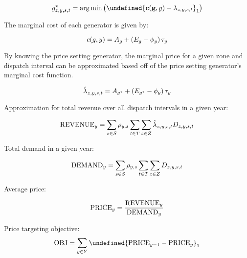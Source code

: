 \documentclass{article}
\let\norm\undefined %
\DeclarePairedDelimiter\norm{\lVert}{\rVert}
\begin{document}
\begin{equation}
\iGenerator^{\star}_{\iZone,\iYear,\iScenario,\iInterval} = \arg\min \left(\norm{\mathbf{c}(\mathbf{\iGenerator}, \iYear) - \dPowerBalance}_{1}\right)
\end{equation}

The marginal cost of each generator is given by:

\begin{equation}
c(\iGenerator, \iYear) = A_{\iGenerator} + \left(\cEmissionsIntensity - \vBaseline\right) \vPermitPrice
\end{equation}

By knowing the price setting generator, the marginal price for a given zone and dispatch interval can be approximated based off of the price setting generator's marginal cost function.

\begin{equation}
\hat{\dPowerBalance[]}_{\iZone,\iYear,\iScenario,\iInterval} = A_{\iGenerator^{\star}} + \left(\cEmissionsIntensity[\iGenerator^{\star}] - \vBaseline\right) \vPermitPrice
\end{equation}

Approximation for total revenue over all dispatch intervals in a given year:

\begin{equation}
\mathrm{REVENUE}_{\iYear} = \sum\limits_{\iScenario \in \sScenarios} \cScenarioDuration \sum\limits_{\iInterval \in \sIntervals}\sum\limits_{\iZone \in \sZones} \hat{\dPowerBalance[]}_{\iZone,\iYear,\iScenario,\iInterval} \cDemand
\end{equation}

Total demand in a given year:

\begin{equation}
\mathrm{DEMAND}_{\iYear} = \sum\limits_{\iScenario \in \sScenarios} \cScenarioDuration \sum\limits_{\iInterval \in \sIntervals}\sum\limits_{\iZone \in \sZones} \cDemand
\end{equation}

Average price:

\begin{equation}
\mathrm{PRICE}_{\iYear} = \frac{\mathrm{REVENUE}_{\iYear}}{\mathrm{DEMAND}_{\iYear}}
\end{equation}

Price targeting objective:
\begin{equation}
\mathrm{OBJ} = \sum\limits_{\iYear \in \sYears} \norm{\mathrm{PRICE}_{\iYear-1} - \mathrm{PRICE}_{\iYear}}_{1}
\end{equation}
\end{document}

